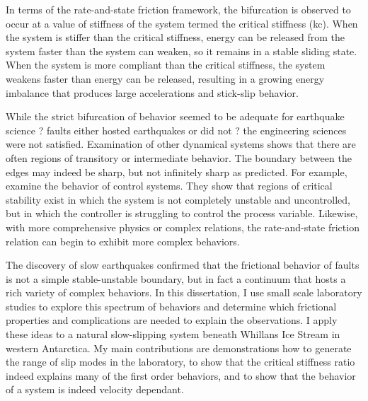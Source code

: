 In terms of the rate-and-state friction framework, the bifurcation is observed to occur at a value of stiffness of the system termed the critical stiffness (kc). When the system is stiffer than the critical stiffness, energy can be released from the system faster than the system can weaken, so it remains in a stable sliding state. When the system is more compliant than the critical stiffness, the system weakens faster than energy can be released, resulting in a growing energy imbalance that produces large accelerations and stick-slip behavior.  

While the strict bifurcation of behavior seemed to be adequate for earthquake science ? faults either hosted earthquakes or did not ? the engineering sciences were not satisfied. Examination of other dynamical systems shows that there are often regions of transitory or intermediate behavior. The boundary between the edges may indeed be sharp, but not infinitely sharp as predicted. For example, examine the behavior of control systems. They show that regions of critical stability exist in which the system is not completely unstable and uncontrolled, but in which the controller is struggling to control the process variable. Likewise, with more comprehensive physics or complex relations, the rate-and-state friction relation can begin to exhibit more complex behaviors. 

The discovery of slow earthquakes confirmed that the frictional behavior of faults is not a simple stable-unstable boundary, but in fact a continuum that hosts a rich variety of complex behaviors. In this dissertation, I use small scale laboratory studies to explore this spectrum of behaviors and determine which frictional properties and complications are needed to explain the observations. I apply these ideas to a natural slow-slipping system beneath Whillans Ice Stream in western Antarctica. My main contributions are demonstrations how to generate the range of slip modes in the laboratory, to show that the critical stiffness ratio indeed explains many of the first order behaviors, and to show that the behavior of a system is indeed velocity dependant.
